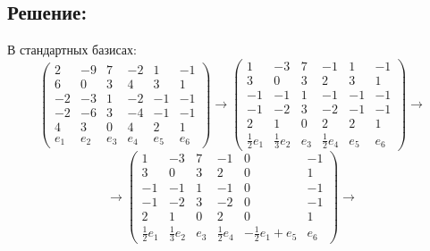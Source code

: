 \documentclass[12pt]{article}
\begin{document}
    \subsection*{Решение:}
    В стандартных базисах:
    \[
        \begin{pmatrix}
            2   & -9  & 7   & -2  & 1   & -1  \\
            6   & 0   & 3   & 4   & 3   & 1   \\
            -2  & -3  & 1   & -2  & -1  & -1  \\
            -2  & -6  & 3   & -4  & -1  & -1  \\
            4   & 3   & 0   & 4   & 2   & 1   \\
            e_1 & e_2 & e_3 & e_4 & e_5 & e_6
        \end{pmatrix}
        \rightarrow
        \begin{pmatrix}
            1               & -3              & 7   & -1              & 1   & -1  \\
            3               & 0               & 3   & 2               & 3   & 1   \\
            -1              & -1              & 1   & -1              & -1  & -1  \\
            -1              & -2              & 3   & -2              & -1  & -1  \\
            2               & 1               & 0   & 2               & 2   & 1   \\
            \frac{1}{2} e_1 & \frac{1}{3} e_2 & e_3 & \frac{1}{2} e_4 & e_5 & e_6
        \end{pmatrix}
        \rightarrow
    \]
    \[
        \rightarrow
        \begin{pmatrix}
            1               & -3              & 7   & -1              & 0                      & -1  \\
            3               & 0               & 3   & 2               & 0                      & 1   \\
            -1              & -1              & 1   & -1              & 0                      & -1  \\
            -1              & -2              & 3   & -2              & 0                      & -1  \\
            2               & 1               & 0   & 2               & 0                      & 1   \\
            \frac{1}{2} e_1 & \frac{1}{3} e_2 & e_3 & \frac{1}{2} e_4 & -\frac{1}{2} e_1 + e_5 & e_6
        \end{pmatrix}
        \rightarrow
    \]
\end{document}

